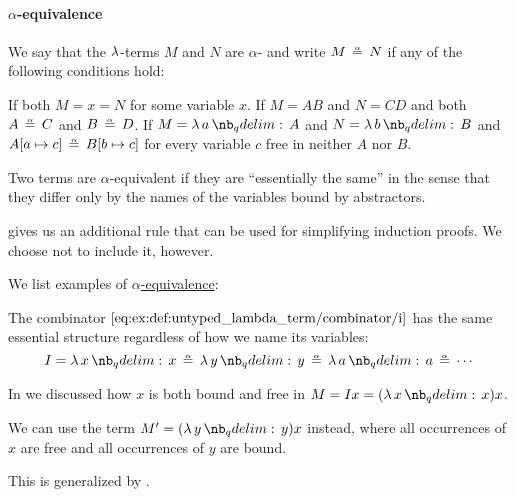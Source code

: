 \paragraph{\( \alpha \)-equivalence}

\begin{definition}\label{def:untyped_lambda_term_alpha_equivalence}\mimprovised
  We say that the \( \mathrm{\lambda} \)-terms \( M \) and \( N \) are \( \alpha \)- and write \( M \aequiv N \) if any of the following conditions hold:
  \begin{thmenum}
     If both \( M = x = N \) for some variable \( x \).
     If \( M = A B \) and \( N = C D \) and both \( A \aequiv C \) and \( B \aequiv D \).
     If \( M = \qabs a A \) and \( N = \qabs b B \) and \( A[a \mapsto c] \aequiv B[b \mapsto c] \) for every variable \( c \) free in neither \( A \) nor \( B \).
  \end{thmenum}
\end{definition}
\begin{comments}
  \item Two terms are \( \alpha \)-equivalent if they are \enquote{essentially the same} in the sense that they differ only by the names of the variables bound by abstractors.

  \item {} gives us an additional rule that can be used for simplifying induction proofs. We choose not to include it, however.
\end{comments}

\begin{example}\label{ex:def:untyped_lambda_term_alpha_equivalence}
  We list examples of \hyperref[def:untyped_lambda_term_alpha_equivalence]{\( \alpha \)-equivalence}:
  \begin{thmenum}
     The combinator \( \ref{eq:ex:def:untyped_lambda_term/combinator/i} \) has the same essential structure regardless of how we name its variables:
    \begin{equation*}
      I = \qabs x x \aequiv \qabs y y \aequiv \qabs a a \aequiv \cdots
    \end{equation*}

     In  we discussed how \( x \) is both bound and free in \( M = Ix = (\qabs x x) x \).

    We can use the term \( M' = (\qabs y y) x \) instead, where all occurrences of \( x \) are free and all occurrences of \( y \) are bound.

    This is generalized by .
  \end{thmenum}
\end{example}

